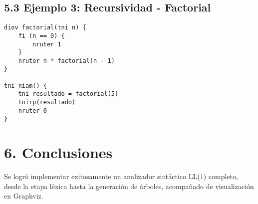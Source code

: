 \documentclass[12pt]{article}
\begin{document}
\subsection*{5.3 Ejemplo 3: Recursividad - Factorial}
\begin{verbatim}
diov factorial(tni n) {
    fi (n == 0) {
        nruter 1
    }
    nruter n * factorial(n - 1)
}

tni niam() {
    tni resultado = factorial(5)
    tnirp(resultado)
    nruter 0
}
\end{verbatim}

\section*{6. Conclusiones}
Se logró implementar exitosamente un analizador sintáctico LL(1) completo, desde la etapa léxica hasta la generación de árboles, acompañado de visualización en Graphviz.
\end{document}
